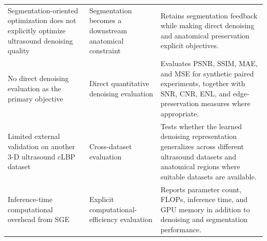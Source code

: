 \documentclass[conference]{IEEEtran}
\begin{document}
\begin{table}[t]
\begin{tabularx}{\textwidth}{
    >{\raggedright\arraybackslash}m{}
    >{\raggedright\arraybackslash}m{}
    >{\raggedright\arraybackslash}X
}
Segmentation-oriented optimization does not explicitly optimize
ultrasound denoising quality
&
Segmentation becomes a downstream anatomical constraint
&
Retains segmentation feedback while making direct denoising and
anatomical preservation explicit objectives.
\\

No direct denoising evaluation as the primary objective
&
Direct quantitative denoising evaluation
&
Evaluates PSNR, SSIM, MAE, and MSE for synthetic paired experiments,
together with SNR, CNR, ENL, and edge-preservation measures where
appropriate.
\\

Limited external validation on another 3-D ultrasound cLBP dataset
&
Cross-dataset evaluation
&
Tests whether the learned denoising representation generalizes across
different ultrasound datasets and anatomical regions where suitable
datasets are available.
\\

Inference-time computational overhead from SGE
&
Explicit computational-efficiency evaluation
&
Reports parameter count, FLOPs, inference time, and GPU memory in
addition to denoising and segmentation performance.
\\

\bottomrule
\end{tabularx}
\end{table}


\end{document}
